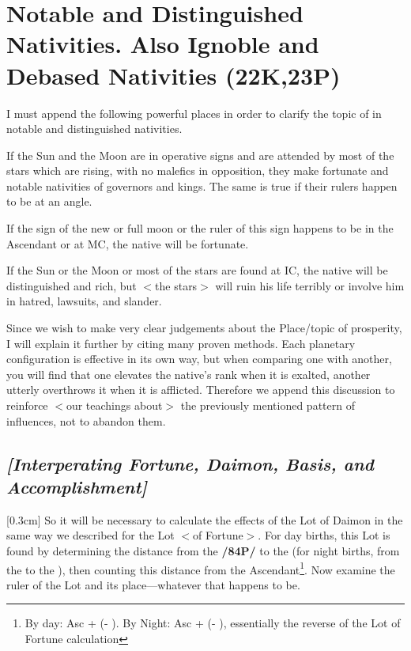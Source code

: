 \section{Notable and Distinguished Nativities. Also Ignoble and Debased Nativities (22K,23P)}

I must append the following powerful places in order to clarify the topic of in notable and distinguished nativities. 

If the Sun and the Moon are in operative signs and are attended by most of the stars which are rising, with no malefics in opposition, they make fortunate and notable nativities of governors and kings. The same is true if their rulers happen to be at an angle. 

If the sign of the new or full moon or the ruler of
this sign happens to be in the Ascendant or at MC, the native will be fortunate. 

If the Sun or the Moon or most of the stars are found at IC, the native will be distinguished and rich, but $<$the stars$>$ will ruin his life terribly or involve him in hatred, lawsuits, and slander.

Since \mndl we wish to make very clear judgements about the Place/topic of prosperity, I will explain it further by citing many proven methods. Each planetary configuration is effective in its own way, but when comparing one with another, you will find that one elevates the native’s rank when it is exalted, another
utterly overthrows it when it is afflicted. Therefore we append this discussion to reinforce $<$our teachings about$>$ the previously mentioned pattern of influences, not to abandon them.

\subsection{\textit{[Interperating Fortune, Daimon, Basis, and Accomplishment]}}
[0.3cm]
So it will be necessary to calculate the effects of the Lot of Daimon in the same way we described for the Lot $<$of Fortune$>$. For day births, this Lot is found by determining the distance from the \Moon\xspace \textbf{/84P/} to the \Sun\xspace (for night births, from the \Sun\xspace to the \Moon), then counting this distance from the Ascendant\footnote{By day: Asc + (\Sun\xspace\xspace - \Moon). By Night: Asc + (\Moon\xspace\xspace - \Sun), essentially the reverse of the Lot of Fortune calculation}. Now examine the ruler of the Lot and its place—whatever that happens to be. 

